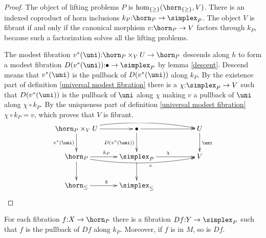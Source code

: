 \documentclass[csh.tex]{subfiles}
\begin{document}
\begin{proof} 
The object of lifting problems $P$ is $\hom_{\set\geq}(\horn_{\set\geq},V)$. There is an indexed coproduct of horn inclusions $k_P\of \horn_P\to\simplex_P$. The object $V$ is fibrant if and only if the canonical morphism $v\of\horn_P\to V$ factors through $k_P$, because such a factorization solves all the lifting problems.

The modest fibration $v\ri(\uni)\of \horn_P\times_V U \to \horn_P$ descends along $h$ to form a modest fibration $D(v\ri(\uni))\of \bullet\to\simplex_P$ by lemma \ref{descent}. Descend means that $v\ri(\uni)$ is the pullback of $D(v\ri(\uni))$ along $k_P$.
By the existence part of definition \ref{universal modest fibration} there is a $\chi\of\simplex_P\to V$ such that $D(v\ri(\uni))$ is the pullback of $\uni$ along $\chi$ making $v$ a pullback of $\uni$ along $\chi\circ k_P$. By the uniqueness part of definition \ref{universal modest fibration} $\chi\circ k_P=v$, which proves that $V$ is fibrant.
\[\xymatrix{
\horn_P\times_V U \ar@/^2ex/[rrr] \ar[r]\ar[d]_{v\ri(\uni)} & \bullet \ar[rr]\ar[d]_{D(v\ri(\uni))} && U\ar[d]^\uni\\
\horn_P\ar[d]\ar@/_2ex/[rrr]_(.6)v\ar[r]^{k_P} & \simplex_P\ar[d]\ar[rr]^{\chi} && V\\
\horn_\leq\ar[r]^k & \simplex_\leq\\
}\]
\end{proof}

\begin{lemma}
For each fibration $f\of X\to \horn_P$ there is a fibration $Df\of Y\to\simplex_P$ such that $f$ is the pullback of $Df$ along $k_P$. Moreover, if $f$ is in $M$, so is $Df$.  \label{descent}
\end{lemma}
\end{document}

